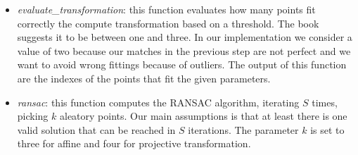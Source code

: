 \begin{itemize}
	\item \textit{evaluate\_transformation}: this function evaluates how many points fit correctly the compute transformation based on a threshold. The book suggests it to be between one and three. In our implementation we consider a value of two because our matches in the previous step are not perfect and we want to avoid wrong fittings because of outliers. The output of this function are the indexes of the points that fit the given parameters.

	\item \textit{ransac}: this function computes the RANSAC algorithm, iterating $S$ times, picking $k$ aleatory points. Our main assumptions is that at least there is one valid solution that can be reached in $S$ iterations. The parameter $k$ is set to three for affine and four for projective transformation.
\end{itemize}
